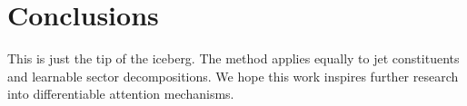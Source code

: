 \section{Conclusions}\label{sec:conclusions}

This is just the tip of the iceberg. The method applies equally to jet
constituents and learnable sector decompositions. We hope this work
inspires further research into differentiable attention mechanisms.

